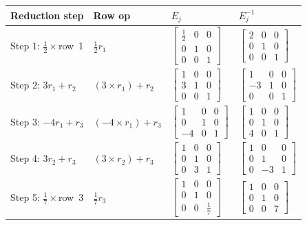\documentclass{article}
\begin{document}
\renewcommand{\arraystretch}{1.1}
\begin{center}
\begin{tabular}{|l|l|l|l|}
\hline
\textbf{Reduction step} & \textbf{Row op} & $E_j$ & $E_j^{-1}$ \\
\hline
Step 1: $\frac{1}{2}\times$row~1 &
$\frac{1}{2}r_1$&
$\begin{bmatrix}\frac{1}{2}&0&0\\0&1&0\\0&0&1\end{bmatrix}$&
$\begin{bmatrix}2&0&0\\0&1&0\\0&0&1\end{bmatrix}$ \\
\hline
Step 2: $3r_1+r_2$ &
$(3\!\times\!r_1)+r_2$&
$\begin{bmatrix}1&0&0\\3&1&0\\0&0&1\end{bmatrix}$&
$\begin{bmatrix}1&0&0\\-3&1&0\\0&0&1\end{bmatrix}$ \\
\hline
Step 3: $-4r_1+r_3$ &
$(-4\!\times\!r_1)+r_3$&
$\begin{bmatrix}1&0&0\\0&1&0\\-4&0&1\end{bmatrix}$&
$\begin{bmatrix}1&0&0\\0&1&0\\4&0&1\end{bmatrix}$ \\
\hline
Step 4: $3r_2+r_3$ &
$(3\!\times\!r_2)+r_3$&
$\begin{bmatrix}1&0&0\\0&1&0\\0&3&1\end{bmatrix}$&
$\begin{bmatrix}1&0&0\\0&1&0\\0&-3&1\end{bmatrix}$ \\
\hline
Step 5: $\frac{1}{7}\times$row~3 &
$\frac{1}{7}r_3$&
$\begin{bmatrix}1&0&0\\0&1&0\\0&0&\frac{1}{7}\end{bmatrix}$&
$\begin{bmatrix}1&0&0\\0&1&0\\0&0&7\end{bmatrix}$ \\
\hline
\end{tabular}
\end{center}
\end{document}
